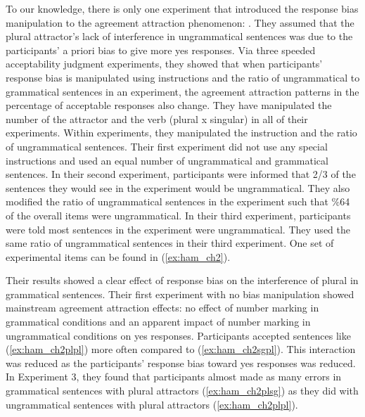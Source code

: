 To our knowledge, there is only one experiment that introduced the response bias manipulation to the agreement attraction phenomenon: . They assumed that the plural attractor's lack of interference in ungrammatical sentences was due to the participants' a priori bias to give more yes responses. Via three speeded acceptability judgment experiments, they showed that when participants' response bias is manipulated using instructions and the ratio of ungrammatical to grammatical sentences in an experiment, the agreement attraction patterns in the percentage of acceptable responses also change. They have manipulated the number of the attractor and the verb (plural x singular) in all of their experiments. Within experiments, they manipulated the instruction and the ratio of ungrammatical sentences. Their first experiment did not use any special instructions and used an equal number of ungrammatical and grammatical sentences. In their second experiment, participants were informed that 2/3 of the sentences they would see in the experiment would be ungrammatical. They also modified the ratio of ungrammatical sentences in the experiment such that \%64 of the overall items were ungrammatical. In their third experiment, participants were told most sentences in the experiment were ungrammatical. They used the same ratio of ungrammatical sentences in their third experiment. One set of experimental items can be found in (\ref{ex:ham_ch2}).

\ea \label{ex:ham_ch2}
  \z
\z

Their results showed a clear effect of response bias on the interference of plural in grammatical sentences. Their first experiment with no bias manipulation showed mainstream agreement attraction effects: no effect of number marking in grammatical conditions and an apparent impact of number marking in ungrammatical conditions on yes responses. Participants accepted sentences like (\ref{ex:ham_ch2plpl}) more often compared to (\ref{ex:ham_ch2sgpl}). This interaction was reduced as the participants' response bias toward yes responses was reduced. In Experiment 3, they found that participants almost made as many errors in grammatical sentences with plural attractors (\ref{ex:ham_ch2plsg}) as they did with ungrammatical sentences with plural attractors (\ref{ex:ham_ch2plpl}).

